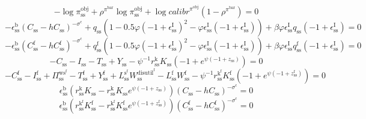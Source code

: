 \begin{equation}
-\log{\pi^{\mathrm{obj}}_\mathrm{ss}} + {\rho^{\pi^{\mathrm{bar}}}} {\log{\pi^{\mathrm{obj}}_\mathrm{ss}}} + {\log{{c\!a\!l\!i\!b\!r}^{\pi^{\mathrm{obj}}}}} \left(1 - \rho^{\pi^{\mathrm{bar}}}\right) = 0
\end{equation}
\begin{equation}
-{\epsilon^{\mathrm{b}}_\mathrm{ss}} {\left(C_\mathrm{ss} - {h} {C_\mathrm{ss}}\right)^{-\sigma^{\mathrm{c}}}} + {q_\mathrm{ss}} \left(1 - 0.5{\varphi} \left(-1 + \epsilon^{\mathrm{I}}_\mathrm{ss}\right)^{2} - {\varphi} {\epsilon^{\mathrm{I}}_\mathrm{ss}} \left(-1 + \epsilon^{\mathrm{I}}_\mathrm{ss}\right)\right) + {\beta} {\varphi} {\epsilon^{\mathrm{I}}_\mathrm{ss}} {q_\mathrm{ss}} \left(-1 + \epsilon^{\mathrm{I}}_\mathrm{ss}\right) = 0
\end{equation}
\begin{equation}
-{\epsilon^{\mathrm{b}}_\mathrm{ss}} {\left(C^{\mathrm{f}}_\mathrm{ss} - {h} {C^{\mathrm{f}}_\mathrm{ss}}\right)^{-\sigma^{\mathrm{c}}}} + {q^{\mathrm{f}}_\mathrm{ss}} \left(1 - 0.5{\varphi} \left(-1 + \epsilon^{\mathrm{I}}_\mathrm{ss}\right)^{2} - {\varphi} {\epsilon^{\mathrm{I}}_\mathrm{ss}} \left(-1 + \epsilon^{\mathrm{I}}_\mathrm{ss}\right)\right) + {\beta} {\varphi} {\epsilon^{\mathrm{I}}_\mathrm{ss}} {q^{\mathrm{f}}_\mathrm{ss}} \left(-1 + \epsilon^{\mathrm{I}}_\mathrm{ss}\right) = 0
\end{equation}
\begin{equation}
-C_\mathrm{ss} - I_\mathrm{ss} - T_\mathrm{ss} + Y_\mathrm{ss} - {\psi}^{-1} {r^{\mathrm{k}}_\mathrm{ss}} {K_\mathrm{ss}} \left(-1 + e^{{\psi} \left(-1 + z_\mathrm{ss}\right)}\right) = 0
\end{equation}
\begin{equation}
-C^{\mathrm{f}}_\mathrm{ss} - I^{\mathrm{f}}_\mathrm{ss} + \Pi^{\mathrm{ws}^{\mathrm{f}}}_\mathrm{ss} - T^{\mathrm{f}}_\mathrm{ss} + Y^{\mathrm{f}}_\mathrm{ss} + {L^{\mathrm{s}^{\mathrm{f}}}_\mathrm{ss}} {W^{\mathrm{disutil}^{\mathrm{f}}}_\mathrm{ss}} - {L^{\mathrm{f}}_\mathrm{ss}} {W^{\mathrm{f}}_\mathrm{ss}} - {\psi}^{-1} {r^{\mathrm{k}^{\mathrm{f}}}_\mathrm{ss}} {K^{\mathrm{f}}_\mathrm{ss}} \left(-1 + e^{{\psi} \left(-1 + z^{\mathrm{f}}_\mathrm{ss}\right)}\right) = 0
\end{equation}
\begin{equation}
{\epsilon^{\mathrm{b}}_\mathrm{ss}} \left({r^{\mathrm{k}}_\mathrm{ss}} {K_\mathrm{ss}} - {r^{\mathrm{k}}_\mathrm{ss}} {K_\mathrm{ss}} {e^{{\psi} \left(-1 + z_\mathrm{ss}\right)}}\right) {\left(C_\mathrm{ss} - {h} {C_\mathrm{ss}}\right)^{-\sigma^{\mathrm{c}}}} = 0
\end{equation}
\begin{equation}
{\epsilon^{\mathrm{b}}_\mathrm{ss}} \left({r^{\mathrm{k}^{\mathrm{f}}}_\mathrm{ss}} {K^{\mathrm{f}}_\mathrm{ss}} - {r^{\mathrm{k}^{\mathrm{f}}}_\mathrm{ss}} {K^{\mathrm{f}}_\mathrm{ss}} {e^{{\psi} \left(-1 + z^{\mathrm{f}}_\mathrm{ss}\right)}}\right) {\left(C^{\mathrm{f}}_\mathrm{ss} - {h} {C^{\mathrm{f}}_\mathrm{ss}}\right)^{-\sigma^{\mathrm{c}}}} = 0
\end{equation}



